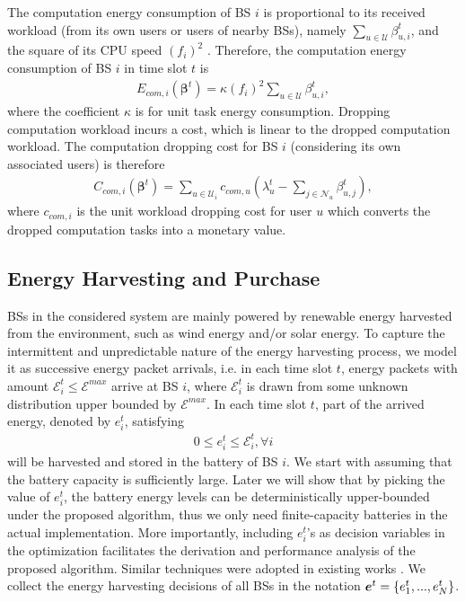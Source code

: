 \documentclass[12pt, draftclsnofoot, letterpaper, onecolumn]{IEEEtran}
\begin{document}
The computation energy consumption of BS $i$ is proportional to its received workload (from its own users or users of nearby BSs), namely $\sum_{u \in \mathcal{U}} \beta^t_{u,i}$, and the square of its CPU speed $(f_i)^2$ \cite{mao2017mobile}. Therefore, the computation energy consumption of BS $i$ in time slot $t$ is
\begin{align}
E_{com,i}(\bm\beta^t) = \kappa(f_i)^2 \sum_{u \in \mathcal{U}} \beta^t_{u,i},
\end{align}
where the coefficient $\kappa$ is for unit task energy consumption. Dropping computation workload incurs a cost, which is linear to the dropped computation workload. The computation dropping cost for BS $i$ (considering its own associated users) is therefore
\begin{align}
C_{com, i}(\bm\beta^t) = \sum_{u\in\mathcal{U}_i}c_{com,u}(\lambda^t_u - \sum_{j\in\mathcal{N}_u}\beta^t_{u,j}),
\end{align}
where $c_{com,i}$ is the unit workload dropping cost for user $u$ which converts the dropped computation tasks into a monetary value.







\subsection{Energy Harvesting and Purchase}
BSs in the considered system are mainly powered by renewable energy harvested from the environment, such as wind energy and/or solar energy.  To capture the intermittent and unpredictable nature of the energy harvesting process, we model it as successive energy packet arrivals, i.e. in each time slot $t$, energy packets with amount $\mathcal{E}_i^t \leq \mathcal{E}^{max}$ arrive at BS $i$, where $\mathcal{E}_i^t$ is drawn from some unknown distribution upper bounded by $\mathcal{E}^{max}$. In each time slot $t$, part of the arrived energy, denoted by $e^t_i$, satisfying
\begin{align}\label{EH}
0 \leq e^t_i \leq \mathcal{E}_i^t, \forall i
\end{align}
will be harvested and stored in the battery of BS $i$. We start with assuming that the battery capacity is sufficiently large. Later we will show that by picking the value of $e^t_i$, the battery energy levels can be deterministically upper-bounded under the proposed algorithm, thus we only need finite-capacity batteries in the actual implementation. More importantly, including $e^t_i$'s as decision variables in the optimization facilitates the derivation and performance analysis of the proposed algorithm. Similar techniques were adopted in existing works \cite{lakshminarayana2014cooperation,mao2015lyapunov}. We collect the energy harvesting decisions of all BSs in the notation ${\boldsymbol{e}}^t = \{e^t_1,...,e^t_N\}$.
\end{document}
